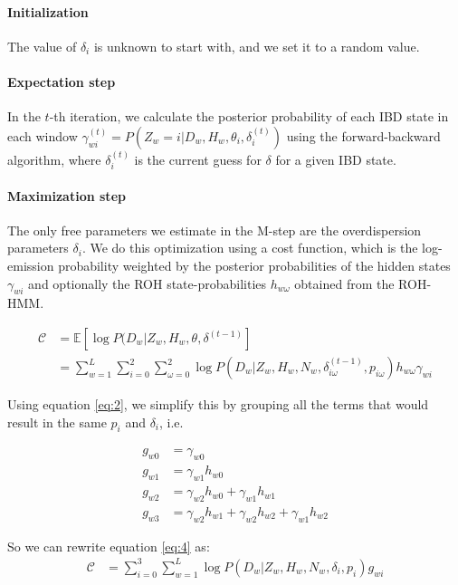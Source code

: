 \documentclass[12pt, letterpaper]{article}
\begin{document}
\paragraph{Initialization}
The value of $\delta_i$ is unknown to start with, and we set it to a random value.

\paragraph{Expectation step}
In the $t$-th iteration, we calculate the posterior probability of each IBD state in each window $\gamma^{(t)}_{wi} = P(Z_w=i | D_w, H_w, \theta_i, \delta_i^{(t)})$ using the forward-backward algorithm, where $\delta_i^{(t)}$ is the current guess for $\delta$ for a given IBD state.

\paragraph{Maximization step}
The only free parameters we estimate in the M-step are the overdispersion parameters $\delta_i$. We do this optimization using a cost function, which is the log-emission probability weighted by the posterior probabilities of the hidden states $\gamma_{wi}$ and optionally the ROH state-probabilities $h_{w\omega}$ obtained from the ROH-HMM.


\begin{align}\label{eq:4}
\mathcal{C} &= \mathbb{E}[\log P(D_w|Z_w, H_w, \theta, \delta^{(t-1)}]\nonumber\\
&= \sum_{w=1}^L \sum_{i=0}^2\sum^2_{\omega=0} \log P(D_{w}|Z_w, H_w, N_w, \delta_{i \omega}^{(t-1)}, p_{i \omega})h_{w\omega}\gamma_{wi}
\end{align}


Using equation \ref{eq:2}, we simplify this by grouping all the terms that would result in the same $p_i$ and $\delta_i$, i.e.

\begin{align*}\label{eq:5}
g_{w0} &= \gamma_{w0}\\
g_{w1} &= \gamma_{w1} h_{w0}\\
g_{w2} &= \gamma_{w2} h_{w0} + \gamma_{w1} h_{w1}\\
g_{w3} &= \gamma_{w2} h_{w1} + \gamma_{w2} h_{w2} + \gamma_{w1} h_{w2}
\end{align*}

So we can rewrite equation \ref{eq:4} as:
\begin{align}\label{eq:6}
\mathcal{C} &= \sum_{i=0}^3 \sum_{w=1}^L \log P(D_{w}|Z_w, H_w, N_w, \delta_i, p_i)g_{wi}
\end{align}
\end{document}

